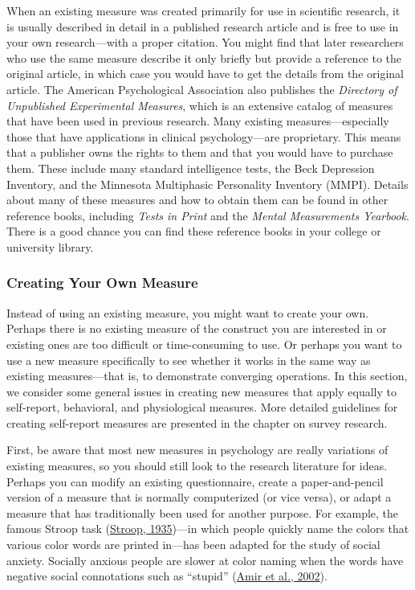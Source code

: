 \documentclass[
]{krantz}
\begin{document}
When an existing measure was created primarily for use in scientific research, it is usually described in detail in a published research article and is free to use in your own research---with a proper citation. You might find that later researchers who use the same measure describe it only briefly but provide a reference to the original article, in which case you would have to get the details from the original article. The American Psychological Association also publishes the \emph{Directory of Unpublished Experimental Measures}, which is an extensive catalog of measures that have been used in previous research. Many existing measures---especially those that have applications in clinical psychology---are proprietary. This means that a publisher owns the rights to them and that you would have to purchase them. These include many standard intelligence tests, the Beck Depression Inventory, and the Minnesota Multiphasic Personality Inventory (MMPI). Details about many of these measures and how to obtain them can be found in other reference books, including \emph{Tests in Print} and the \emph{Mental Measurements Yearbook}. There is a good chance you can find these reference books in your college or university library.

\hypertarget{creating-your-own-measure}{%
\subsubsection*{Creating Your Own Measure}\label{creating-your-own-measure}}


Instead of using an existing measure, you might want to create your own. Perhaps there is no existing measure of the construct you are interested in or existing ones are too difficult or time-consuming to use. Or perhaps you want to use a new measure specifically to see whether it works in the same way as existing measures---that is, to demonstrate converging operations. In this section, we consider some general issues in creating new measures that apply equally to self-report, behavioral, and physiological measures. More detailed guidelines for creating self-report measures are presented in the chapter on survey research.

First, be aware that most new measures in psychology are really variations of existing measures, so you should still look to the research literature for ideas. Perhaps you can modify an existing questionnaire, create a paper-and-pencil version of a measure that is normally computerized (or vice versa), or adapt a measure that has traditionally been used for another purpose. For example, the famous Stroop task (\protect\hyperlink{ref-stroop1935studies}{Stroop, 1935})---in which people quickly name the colors that various color words are printed in---has been adapted for the study of social anxiety. Socially anxious people are slower at color naming when the words have negative social connotations such as ``stupid'' (\protect\hyperlink{ref-amir2002enhanced}{Amir et al., 2002}).
\end{document}
